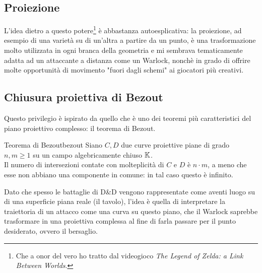 \documentclass{article}
\begin{document}
\subsection{Proiezione}

L'idea dietro a questo potere\footnote{Che a onor del vero ho tratto dal videogioco \textit{The Legend of Zelda: a Link Between Worlds}.} è abbastanza autoesplicativa: la proiezione, ad esempio di una varietà su di un'altra a partire da un punto, è una trasformazione molto utilizzata in ogni branca della geometria e mi sembrava tematicamente adatta ad un attaccante a distanza come un Warlock, nonchè in grado di offrire molte opportunità di movimento "fuori dagli schemi" ai giocatori più creativi.

\subsection{Chiusura proiettiva di Bezout}

Questo privilegio è ispirato da quello che è uno dei teoremi più caratteristici del piano proiettivo complesso: il teorema di Bezout.

\begin{theorem}{Teorema di Bezout}{bezout}
    Siano $C, D$ due curve proiettive piane di grado $n,m\ge 1$ su un campo algebricamente chiuso $\mathbb{K}$.\\
    Il numero di intersezioni contate con molteplicità di $C$ e $D$ è $n\cdot m$, a meno che esse non abbiano una componente in comune: in tal caso questo è infinito.
\end{theorem}

Dato che spesso le battaglie di D\&D vengono rappresentate come aventi luogo su di una superficie piana reale (il tavolo), l'idea è quella di interpretare la traiettoria di un attacco come una curva su questo piano, che il Warlock saprebbe trasformare in una proiettiva complessa al fine di farla passare per il punto desiderato, ovvero il bersaglio.
\end{document}
